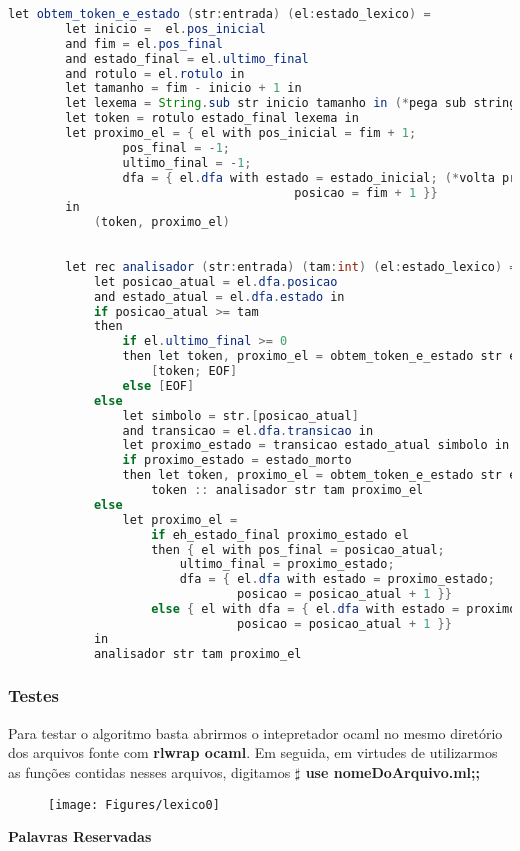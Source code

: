 \documentclass[hidelinks,12pt]{article}
\begin{document}
	\begin{lstlisting}[caption=Código em Java,language=java]
		let obtem_token_e_estado (str:entrada) (el:estado_lexico) = 
		let inicio =  el.pos_inicial 
		and fim = el.pos_final
		and estado_final = el.ultimo_final
		and rotulo = el.rotulo in
		let tamanho = fim - inicio + 1 in
		let lexema = String.sub str inicio tamanho in (*pega sub string*)
		let token = rotulo estado_final lexema in
		let proximo_el = { el with pos_inicial = fim + 1;
				pos_final = -1;
				ultimo_final = -1;
				dfa = { el.dfa with estado = estado_inicial; (*volta pro estado inicial*)
										posicao = fim + 1 }}
		in
			(token, proximo_el)
		
		
		let rec analisador (str:entrada) (tam:int) (el:estado_lexico) =
			let posicao_atual = el.dfa.posicao
			and estado_atual = el.dfa.estado in
			if posicao_atual >= tam
			then
				if el.ultimo_final >= 0
				then let token, proximo_el = obtem_token_e_estado str el in
					[token; EOF]
				else [EOF]
			else
				let simbolo = str.[posicao_atual]
				and transicao = el.dfa.transicao in
				let proximo_estado = transicao estado_atual simbolo in
				if proximo_estado = estado_morto
				then let token, proximo_el = obtem_token_e_estado str el in
					token :: analisador str tam proximo_el
			else
				let proximo_el =
					if eh_estado_final proximo_estado el
					then { el with pos_final = posicao_atual;
						ultimo_final = proximo_estado;
						dfa = { el.dfa with estado = proximo_estado;
								posicao = posicao_atual + 1 }}
					else { el with dfa = { el.dfa with estado = proximo_estado;
								posicao = posicao_atual + 1 }}
			in
			analisador str tam proximo_el
	\end{lstlisting}
	
	
	\subsubsection{Testes}
	
	Para testar o algoritmo basta abrirmos o intepretador ocaml no mesmo diretório dos arquivos fonte com \textbf{rlwrap ocaml}. Em seguida, em virtudes de utilizarmos as funções contidas nesses arquivos, digitamos \textbf{$\sharp$ use nomeDoArquivo.ml;;} 
	
	\begin{figure}[!h]
		\centering
		\texttt{[image: Figures/lexico0]}
	\end{figure}
	\newpage
	
	\noindent\textbf{\large Palavras Reservadas}
	
\end{document}
